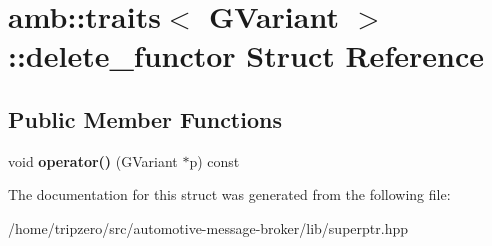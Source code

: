 \hypertarget{structamb_1_1traits_3_01GVariant_01_4_1_1delete__functor}{\section{amb\-:\-:traits$<$ G\-Variant $>$\-:\-:delete\-\_\-functor Struct Reference}
\label{structamb_1_1traits_3_01GVariant_01_4_1_1delete__functor}
}
\subsection*{Public Member Functions}
\begin{DoxyCompactItemize}
\item 
\hypertarget{structamb_1_1traits_3_01GVariant_01_4_1_1delete__functor_aa0393bd9227a3112d0708e3b417de044}{void {\bfseries operator()} (G\-Variant $\ast$p) const }\label{structamb_1_1traits_3_01GVariant_01_4_1_1delete__functor_aa0393bd9227a3112d0708e3b417de044}

\end{DoxyCompactItemize}


The documentation for this struct was generated from the following file\-:\begin{DoxyCompactItemize}
\item 
/home/tripzero/src/automotive-\/message-\/broker/lib/superptr.\-hpp\end{DoxyCompactItemize}
